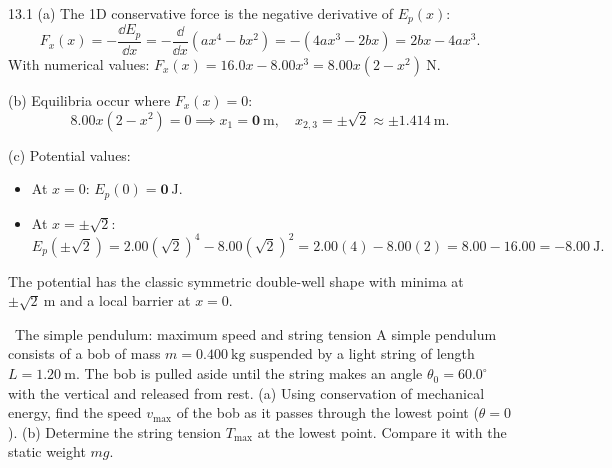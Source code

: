 \begin{solution}{13.1}
(a) The 1D conservative force is the negative derivative of $E_p(x)$:
\[
F_x(x) = -\frac{\dd E_p}{\dd x} = -\frac{\dd}{\dd x}\left(ax^4 - bx^2\right) = -(4ax^3 - 2bx) = \boxed{2bx - 4ax^3.}
\]
With numerical values: $F_x(x) = 16.0x - 8.00x^3 = 8.00x(2 - x^2)\ \mathrm{N}$.

(b) Equilibria occur where $F_x(x) = 0$:
\[
8.00x(2 - x^2) = 0 \implies x_1 = \mathbf{0\ \mathrm{m}},\quad x_{2, 3} = \pm\sqrt{2} \approx \mathbf{\pm 1.414\ \mathrm{m}.}
\]

(c) Potential values:
\begin{itemize}[leftmargin=1.4em,itemsep=2pt]
  \item At $x = 0$: $E_p(0) = \mathbf{0\ \mathrm{J}}$.
  \item At $x = \pm\sqrt{2}$:
  \[
  E_p(\pm\sqrt{2}) = 2.00(\sqrt{2})^4 - 8.00(\sqrt{2})^2 = 2.00(4) - 8.00(2) = 8.00 - 16.00 = \mathbf{-8.00\ \mathrm{J}.}
  \]
\end{itemize}
The potential has the classic symmetric double-well shape with minima at $\pm\sqrt{2}\ \mathrm{m}$ and a local barrier at $x = 0$.
\end{solution}

\begin{exercise}{\warm\ The simple pendulum: maximum speed and string tension}
A simple pendulum consists of a bob of mass $m=0.400\ \mathrm{kg}$ suspended by a light string of length $L=1.20\ \mathrm{m}$. The bob is pulled aside until the string makes an angle $\theta_0 = 60.0^\circ$ with the vertical and released from rest.
(a) Using conservation of mechanical energy, find the speed $v_{\max}$ of the bob as it passes through the lowest point ($\theta = 0$).
(b) Determine the string tension $T_{\max}$ at the lowest point. Compare it with the static weight $mg$.
\end{exercise}

\begin{tabletworkspace}[5.5cm]
\end{tabletworkspace}

